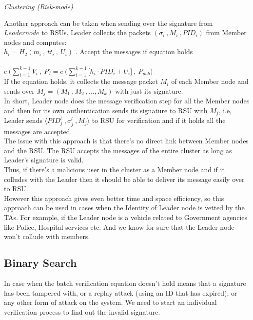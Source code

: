 \documentclass[10pt,journal,letterpaper]{IEEEtran}
\begin{document}
\begin{center}
    \emph{Clustering (Risk-mode)}
\end{center}
Another approach can be taken when sending over the signature from $Leader node$ to RSUs. Leader collects the packets $(\sigma_i \: , M_i \:, PID_i)$ from Member nodes and computes:\\
        $h_i = H_2(m_i\:,\:tt_i\:,\:U_i)$ .
Accept the messages if equation holds \\ \\
    $e\: \bigg( \sum \limits_{i=1}^{k-1}V_i\:,\:P \bigg) = e\: \bigg( \sum\limits_{i=1}^{k-1}\Big[ h_i\cdot PID_i + U_i \Big]\:,\:P_{pub} \bigg) $ \\

If the equation holds, it collects the message packet $M_i$ of each Member node and sends over $M_j = (M_1 \:, M_2 \:, ... , M_{k})$ with just its signature.\\
In short, Leader node does the message verification step for all the Member nodes and then for its own authentication sends its signature to RSU with $M_j$, i.e, Leader sends $\big \langle PID^l_j \:, \sigma^l_j \:, M_j \big \rangle$ to RSU for verification and if it holds all the messages are accepted.\\
The issue with this approach is that there’s no direct link between Member nodes and the RSU. The RSU accepts the messages of the entire cluster as long as Leader’s signature is valid. \\Thus, if there’s a malicious user in the cluster as a Member node and if it colludes with the Leader then it should be able to deliver its message easily over to RSU.\\
However this approach gives even better time and space efficiency,
so this approach can be used in cases when the Identity of Leader
node is vetted by the TAs. For example, if the Leader node is a
vehicle related to Government agencies like Police, Hospital
services etc. And we know for sure that the Leader node won't
collude with members.

\subsection{Binary Search}
In case when the batch verification equation doesn't hold means that a signature has been tampered with, or a replay attack (using an ID that has expired), or any other form of attack on the system. We need to start an individual verification process to find out the invalid signature.\\
\end{document}
